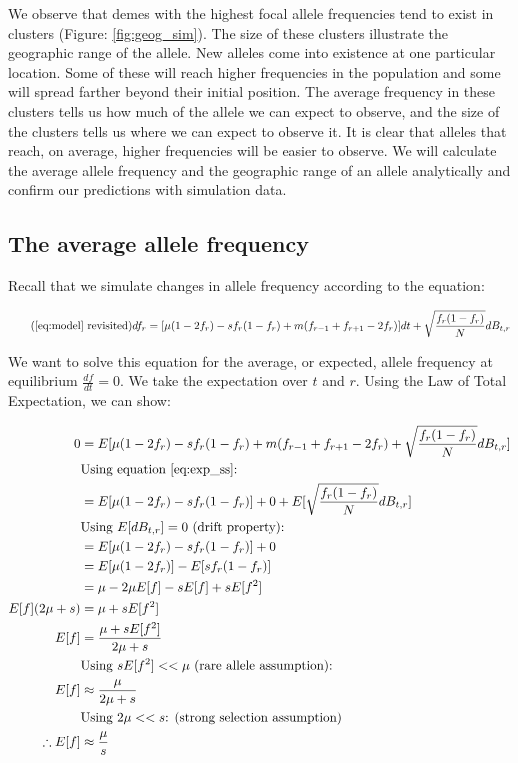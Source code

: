 We observe that demes with the highest focal allele frequencies tend to exist in clusters (Figure: \ref{fig:geog_sim}). The size of these clusters illustrate the geographic range of the allele. New alleles come into existence at one particular location. Some of these will reach higher frequencies in the population and some will spread farther beyond their initial position. The average frequency in these clusters tells us how much of the allele we can expect to observe, and the size of the clusters tells us where we can expect to observe it. It is clear that alleles that reach, on average, higher frequencies will be easier to observe. We will calculate the average allele frequency and the geographic range of an allele analytically and confirm our predictions with simulation data.


\subsection{The average allele frequency}
Recall that we simulate changes in allele frequency according to the equation:

\begin{equation}
    \tag{\ref{eq:model} revisited}
    df_r=[\mu(1-2f_r)-sf_r (1-f_r ) + m (f_{r-1}+f_{r+1}-2f_r)]dt+\sqrt{\frac{f_r (1-f_r )}{N}} dB_{t,r}
\end{equation}

We want to solve this equation for the average, or expected, allele frequency at equilibrium $\frac{df}{dt} = 0$. We take the expectation over $t$ and $r$. Using the Law of Total Expectation, we can show:

\begin{equation}
    \begin{split}
        0 &= E[\mu(1-2f_r)-sf_r (1-f_r ) + m (f_{r-1}+f_{r+1}-2f_r)+\sqrt{\frac{f_r (1-f_r )}{N}} dB_{t,r}] \\ 
        & \text{Using equation \ref{eq:exp_ss}:} \\
        &= E[\mu(1-2f_r)-sf_r (1-f_r )] + 0 + E[\sqrt{\frac{f_r (1-f_r )}{N}} dB_{t,r}]  \\
        & \text{Using $E[dB_{t,r}] = 0$ (drift property):} \\
        &= E[\mu(1-2f_r)-sf_r (1-f_r )] + 0  \\
        &= E[\mu(1-2f_r)] - E[sf_r (1-f_r)] \\
        &= \mu - 2\mu E[f] - sE[f] + sE[f^2] \\
        E[f](2\mu + s) &= \mu + sE[f^2] \\
        E[f] &= \frac{\mu + sE[f^2]}{2\mu + s} \\
        & \text{Using $sE[f^2] << \mu$ (rare allele assumption):} \\
        E[f] &\approx  \frac{\mu}{2\mu + s}  \\
        & \text{Using $2\mu << s$: (strong selection assumption)} \\
        \therefore E[f] &\approx \frac{\mu}{s} 
    \end{split}
\end{equation}


